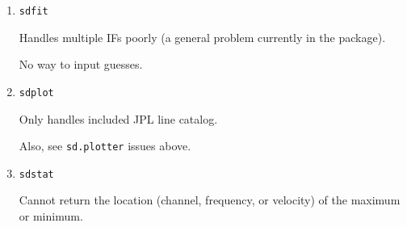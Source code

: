 \begin{enumerate}
\item {\tt sdfit}

  Handles multiple IFs poorly (a general problem currently in the package).

  No way to input guesses.

\item {\tt sdplot}

  Only handles included JPL line catalog.

  Also, see {\tt sd.plotter} issues above.

\item {\tt sdstat}

  Cannot return the location (channel, frequency, or velocity) of the
  maximum or minimum.

\end{enumerate}

